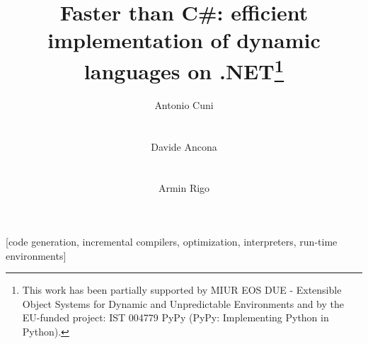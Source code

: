 \documentclass{acm_proc_article-sp}
\begin{document}

\title{Faster than C\#: efficient implementation of dynamic languages on
  .NET\thanks{This work has been partially supported by MIUR EOS DUE -
    Extensible Object Systems for Dynamic and Unpredictable Environments and
    by the EU-funded project: IST 004779 PyPy (PyPy: Implementing Python in
    Python).}}



\author{
\alignauthor Antonio Cuni\\
       \\
       \\
\alignauthor Davide Ancona\\
       \\
       \\
\alignauthor Armin Rigo\\
}

\maketitle

[code generation,
incremental compilers, optimization, interpreters, run-time environments]
\end{document}
